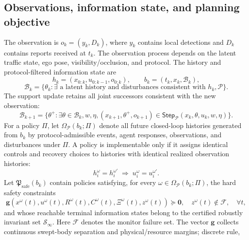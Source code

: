 \documentclass[letterpaper]{article} %
\begin{document}
\subsection{Observations, information state, and planning objective}
The observation is $o_k=(y_k,D_k)$, where $y_k$ contains local detections and
$D_k$ contains reports received at $t_k$. The observation process depends on
the latent traffic state, ego pose, visibility/occlusion, and protocol. The
history and protocol-filtered information state are
\begin{equation}
 h_k=(x_{0:k},u_{0:k-1},o_{0:k}),\qquad
 b_k=(t_k,x_k,\mathcal B_k),
 \label{eq:belief-history}
\end{equation}
\begin{equation}
 \mathcal B_k=\{\theta_k:\exists\text{ a latent history and disturbances
 consistent with }h_k,\mathcal P\}.
 \label{eq:belief}
\end{equation}
The support update retains all joint successors consistent with the new
observation:
\begin{equation}
 \mathcal B_{k+1}=\{\theta^+:\exists\theta\in\mathcal B_k,w,\eta,
 (x_{k+1},\theta^+,o_{k+1})\in
 \mathsf{Step}_{\mathcal P}(x_k,\theta,u_k,w,\eta)\}.
 \label{eq:belief-update}
\end{equation}
For a policy $\Pi$, let $\Omega_{\mathcal P}(b_k;\Pi)$ denote all future
closed-loop histories generated from $b_k$ by protocol-admissible events,
agent responses, observations, and disturbances under $\Pi$. A policy is
implementable only if it assigns identical controls and recovery choices to
histories with identical realized observation histories:
\begin{equation}
 h_i^\omega=h_i^{\omega'}\;\Longrightarrow\;
 u_i^\omega=u_i^{\omega'}.
 \label{eq:nonanticipativity}
\end{equation}
Let $\mathfrak P_{\mathrm{safe}}(b_k)$ contain policies satisfying, for every
$\omega\in\Omega_{\mathcal P}(b_k;\Pi)$, the hard safety constraints
\begin{equation}
 \mathbf g(x^\omega(t),u^\omega(t),R^\omega(t),C^\omega(t),\Xi^\omega(t),z^\omega(t))
 \succeq\mathbf 0,\quad z^\omega(t)\notin\mathcal F,\quad
 \forall t,
 \label{eq:hard-safety}
\end{equation}
and whose reachable terminal information states belong to the certified
robustly invariant set $\mathcal S_\infty$. Here $\mathcal F$ denotes the
monitor failure set. The vector $\mathbf g$ collects
continuous swept-body separation and physical/resource margins; discrete rule,
\end{document}
